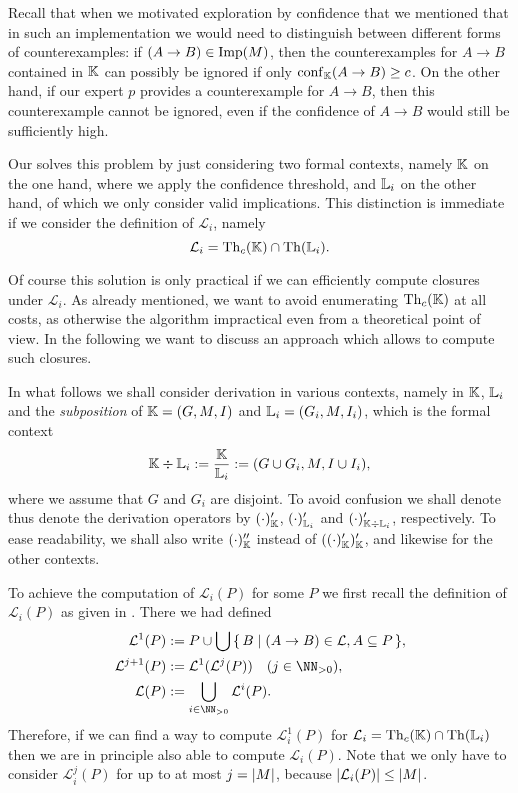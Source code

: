 Recall that when we motivated exploration by confidence that we mentioned that in such an
implementation we would need to distinguish between different forms of counterexamples: if
$(A \to B) \in \operatorname{Imp}(M)$, then the counterexamples for $A \to B$ contained in ${\mathbb{K}}$ can
possibly be ignored if only $\operatorname{conf}_{{\mathbb{K}}}(A \to B) \ge c$.  On the other hand, if our
expert $p$ provides a counterexample for $A \to B$, then this counterexample cannot be
ignored, even if the confidence of $A \to B$ would still be sufficiently high.

Our  solves this problem by just
considering two formal contexts, namely ${\mathbb{K}}$ on the one hand, where we apply the
confidence threshold, and ${\mathbb{L}}_{i}$ on the other hand, of which we only consider valid
implications.  This distinction is immediate if we consider the definition of
$\mathcal{L}_{i}$, namely
\begin{equation*}
  \mathcal{L}_{i} = \operatorname{Th}_{c}({\mathbb{K}}) \cap \operatorname{Th}({\mathbb{L}}_{i}).
\end{equation*}

Of course this solution is only practical if we can efficiently compute closures under
$\mathcal{L}_{i}$.  As already mentioned, we want to avoid enumerating $\operatorname{Th}_{c}({\mathbb{K}})$
at all costs, as otherwise the algorithm impractical even from a theoretical point of
view.  In the following we want to discuss an approach which allows to compute such
closures.

In what follows we shall consider derivation in various contexts, namely in ${\mathbb{K}}$,
${\mathbb{L}}_{i}$ and the \emph{subposition} of ${\mathbb{K}} = (G, M, I)$ and ${\mathbb{L}}_{i} = (G_{i},
M, I_{i})$, which is the formal context
\begin{equation*}
  {\ensuremath{\mathbb{K}}} \div {\ensuremath{\mathbb{L}}}_{i} := \frac {{\mathbb{K}}} {{\mathbb{L}}_{i}} := (G \cup G_{i}, M, I \cup I_{i}),
\end{equation*}
where we assume that $G$ and $G_{i}$ are disjoint.  To avoid confusion we shall denote
thus denote the derivation operators by $(\cdot)'_{{\mathbb{K}}}$, $(\cdot)'_{{\mathbb{L}}_{i}}$ and
$(\cdot)'_{{\mathbb{K}} \div {\ensuremath{\mathbb{L}}}_{i}}$, respectively.  To ease readability, we shall also
write $(\cdot)''_{{\mathbb{K}}}$ instead of $((\cdot)'_{{\mathbb{K}}})'_{{\mathbb{K}}}$, and likewise for
the other contexts.

To achieve the computation of $\mathcal{L}_{i}(P)$ for some $P$ we first recall the
definition of $\mathcal{L}_{i}(P)$ as given in .  There
we had defined
\begin{align*}
  \mathcal{L}^{1}(P) &:= P \cup \bigcup \set{ B \mid (A \to B) \in \mathcal{L}, A
    \subseteq P }, \\
  \mathcal{L}^{j+1}(P) &:= \mathcal{L}^{1}(\mathcal{L}^{j}(P)) \quad (j \in \NN_{> 0}), \\
  \mathcal{L}(P) & := \bigcup_{i \in \NN_{>0}} \mathcal{L}^{i}(P).
\end{align*}
Therefore, if we can find a way to compute $\mathcal{L}_{i}^{1}(P)$ for $\mathcal{L}_{i} =
\operatorname{Th}_{c}({\mathbb{K}}) \cap \operatorname{Th}({\mathbb{L}}_{i})$ then we are in principle also able to compute
$\mathcal{L}_{i}(P)$.  Note that we only have to consider $\mathcal{L}_{i}^{j}(P)$ for up
to at most $j = \lvert M\rvert$, because $\lvert \mathcal{L}_{i}(P) \rvert \le \lvert M\rvert$.

